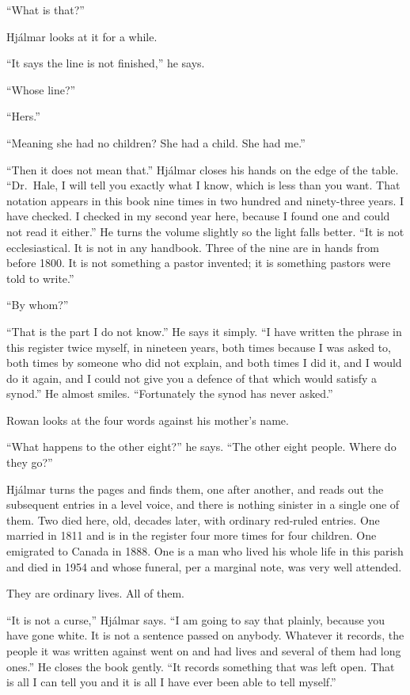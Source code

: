 \documentclass[11pt,oneside]{book}
\begin{document}
``What is that?''

Hjálmar looks at it for a while.

``It says the line is not finished,'' he says.

``Whose line?''

``Hers.''

``Meaning she had no children? She had a child. She had me.''

``Then it does not mean that.'' Hjálmar closes his hands on the edge of
the table. ``Dr.~Hale, I will tell you exactly what I know, which is
less than you want. That notation appears in this book nine times in two
hundred and ninety-three years. I have checked. I checked in my second
year here, because I found one and could not read it either.'' He turns
the volume slightly so the light falls better. ``It is not
ecclesiastical. It is not in any handbook. Three of the nine are in
hands from before 1800. It is not something a pastor invented; it is
something pastors were told to write.''

``By whom?''

``That is the part I do not know.'' He says it simply. ``I have written
the phrase in this register twice myself, in nineteen years, both times
because I was asked to, both times by someone who did not explain, and
both times I did it, and I would do it again, and I could not give you a
defence of that which would satisfy a synod.'' He almost smiles.
``Fortunately the synod has never asked.''

Rowan looks at the four words against his mother's name.

``What happens to the other eight?'' he says. ``The other eight people.
Where do they go?''

Hjálmar turns the pages and finds them, one after another, and reads
out the subsequent entries in a level voice, and there is nothing
sinister in a single one of them. Two died here, old, decades later,
with ordinary red-ruled entries. One married in 1811 and is in the
register four more times for four children. One emigrated to Canada in
1888. One is a man who lived his whole life in this parish and died in
1954 and whose funeral, per a marginal note, was very well attended.

They are ordinary lives. All of them.

``It is not a curse,'' Hjálmar says. ``I am going to say that plainly,
because you have gone white. It is not a sentence passed on anybody. Whatever
it records, the people it was written against went on and had lives and
several of them had long ones.'' He closes the book gently. ``It records
something that was left open. That is all I can tell you and it is all
I have ever been able to tell myself.''
\end{document}

